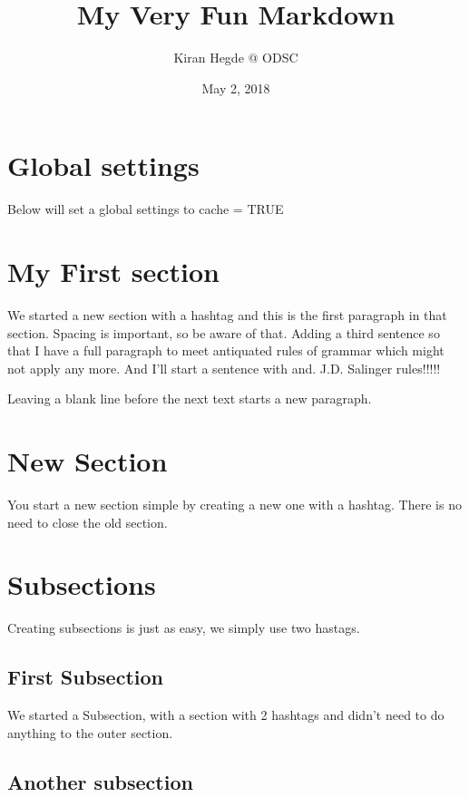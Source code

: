 \documentclass[]{article}
\title{My Very Fun Markdown}
\author{Kiran Hegde @ ODSC}
\date{May 2, 2018}
\begin{document}
\maketitle

{
\setcounter{tocdepth}{2}
\tableofcontents
}
\section{Global settings}\label{global-settings}

Below will set a global settings to cache = TRUE

\section{My First section}\label{my-first-section}

We started a new section with a hashtag and this is the first paragraph
in that section. Spacing is important, so be aware of that. Adding a
third sentence so that I have a full paragraph to meet antiquated rules
of grammar which might not apply any more. And I'll start a sentence
with and. J.D. Salinger rules!!!!!

Leaving a blank line before the next text starts a new paragraph.

\section{New Section}\label{new-section}

You start a new section simple by creating a new one with a hashtag.
There is no need to close the old section.

\section{Subsections}\label{subsections}

Creating subsections is just as easy, we simply use two hastags.

\subsection{First Subsection}\label{first-subsection}

We started a Subsection, with a section with 2 hashtags and didn't need
to do anything to the outer section.

\subsection{Another subsection}\label{another-subsection}
\end{document}
